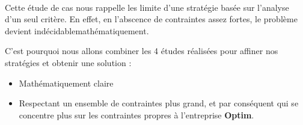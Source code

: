 \begin{center}
\end{center}
~\\
Cette étude de cas nous rappelle les limite d'une stratégie basée sur l'analyse d'un seul critère. En effet, 
en l'abscence de contraintes assez fortes, le problème devient \og indécidable\fg mathématiquement.

C'est pourquoi nous allons combiner les 4 études réalisées pour affiner nos stratégies et obtenir une solution : 
\begin{itemize}
	\item Mathématiquement claire
	\item Respectant un ensemble de contraintes plus grand, et par conséquent qui se concentre plus sur les
	contraintes propres à l'entreprise \textbf{Optim}.
\end{itemize}
